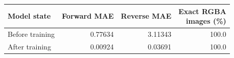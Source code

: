 \begin{tabular}{lrrr}
\toprule
Model state & Forward MAE & Reverse MAE & \shortstack{Exact RGBA\\images (\%)} \\
\midrule
Before training & 0.77634 & 3.11343 & 100.0 \\
After training & 0.00924 & 0.03691 & 100.0 \\
\bottomrule
\end{tabular}
